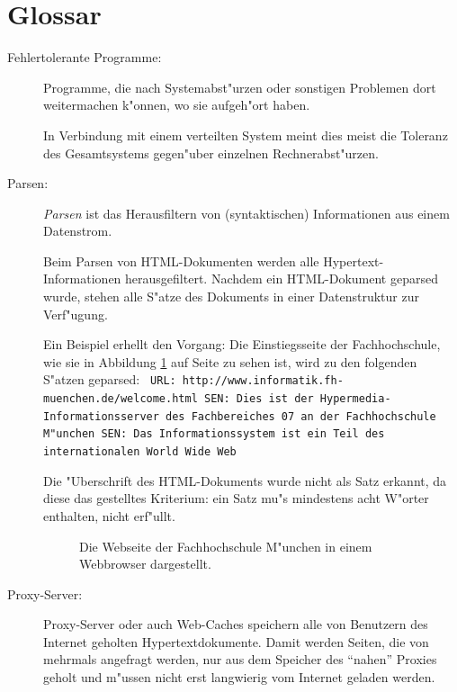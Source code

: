 \chapter*{Glossar}
\label{Glossar}

\begin{description}


\item[Fehlertolerante Programme:] Programme, die nach Systemabst"urzen oder sonstigen Problemen dort weitermachen k"onnen, wo sie aufgeh"ort haben. 

In Verbindung mit einem verteilten System meint dies meist die Toleranz des Gesamtsystems gegen"uber einzelnen Rechnerabst"urzen.



\item[Parsen:]	{\em Parsen} ist das Herausfiltern von (syntaktischen) Informationen aus einem Datenstrom. 
				
Beim Parsen von HTML-Dokumenten werden alle Hypertext-Informationen herausgefiltert. Nachdem ein HTML-Dokument geparsed wurde, stehen alle S"atze des Dokuments in einer Datenstruktur zur Verf"ugung.

Ein Beispiel erhellt den Vorgang: Die Einstiegsseite der Fachhochschule, wie sie in Abbildung \ref{FachhochschuleHTML} auf Seite \pageref{FachhochschuleHTML} zu sehen ist, wird zu den folgenden S"atzen geparsed:
\nl
{\tt \nl
URL: http://www.informatik.fh-muenchen.de/welcome.html	\nl
SEN: Dies ist der Hypermedia-Informationsserver des Fachbereiches 07 an der Fachhochschule M"unchen	\nl
SEN: Das Informationssystem ist ein Teil des internationalen World Wide Web	\nl
}
				
Die "Uberschrift des HTML-Dokuments wurde nicht als Satz erkannt, da diese das gestelltes Kriterium: ein Satz mu"s mindestens acht W"orter enthalten, nicht erf"ullt.
				
\begin{figure}[p]
	\caption{Die Webseite der Fachhochschule M"unchen in einem Webbrowser dargestellt.}
	\label{FachhochschuleHTML}
\end{figure}


\item[Proxy-Server:]	Proxy-Server oder auch Web-Caches speichern alle von Benutzern des Internet geholten Hypertextdokumente. Damit werden Seiten, die von mehrmals angefragt werden, nur aus dem Speicher des "`nahen"' Proxies geholt und m"ussen nicht erst langwierig vom Internet geladen werden.



\end{description}
